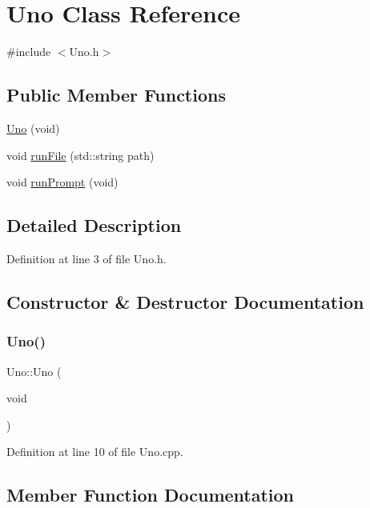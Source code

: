 \hypertarget{classUno}{}\section{Uno Class Reference}
\label{classUno}


{\ttfamily \#include $<$Uno.\+h$>$}

\subsection*{Public Member Functions}
\begin{DoxyCompactItemize}
\item 
\hyperlink{classUno_a82b3a76110117d20bf7d1dd5b9a29e98}{Uno} (void)
\item 
void \hyperlink{classUno_a5fd4f1a9a1688bee5a329dcc191c02f6}{run\+File} (std\+::string path)
\item 
void \hyperlink{classUno_aa690e5403bb1d8a9d3af81b4fa664e1c}{run\+Prompt} (void)
\end{DoxyCompactItemize}


\subsection{Detailed Description}


Definition at line 3 of file Uno.\+h.



\subsection{Constructor \& Destructor Documentation}
\mbox{\label{classUno_a82b3a76110117d20bf7d1dd5b9a29e98}} 
\subsubsection{\texorpdfstring{Uno()}{Uno()}}
{\footnotesize\ttfamily Uno\+::\+Uno (\begin{DoxyParamCaption}\item[{void}]{ }\end{DoxyParamCaption})}



Definition at line 10 of file Uno.\+cpp.



\subsection{Member Function Documentation}
\mbox{\label{classUno_a5fd4f1a9a1688bee5a329dcc191c02f6}} 
